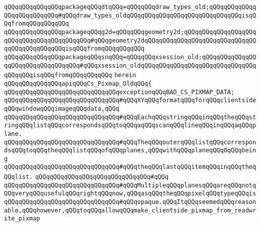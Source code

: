 \verb|qQQqqQQqqQQqqQQqpackageqQQqdtqQQq=qQQqqQQqdraw_types_old;qQQqqQQqqQQqqQQqqQQqqQQqqQQq#qQQqdraw_types_oldqQQqqQQqqQQqqQQqqQQqqQQqqQQqqQQqisqQQqfromqQQqqQQqqQQq|\newline
\verb|qQQqqQQqqQQqqQQqpackageqQQqg2d=qQQqqQQqgeometry2d;qQQqqQQqqQQqqQQqqQQqqQQqqQQqqQQqqQQqqQQqqQQq#qQQqgeometry2dqQQqqQQqqQQqqQQqqQQqqQQqqQQqqQQqqQQqqQQqqQQqqQQqisqQQqfromqQQqqQQqqQQq|\newline
\verb|qQQqqQQqqQQqqQQqpackageqQQqsnqQQq=qQQqqQQqxsession_old;qQQqqQQqqQQqqQQqqQQqqQQqqQQqqQQqqQQq#qQQqxsession_oldqQQqqQQqqQQqqQQqqQQqqQQqqQQqqQQqqQQqqQQqisqQQqfromqQQqqQQqqQQq|\newline
\verb|herein|\newline
\newline
\verb|qQQqqQQqqQQqqQQqapiqQQqCs_Pixmap_OldqQQq{|\newline
\newline
\verb|qQQqqQQqqQQqqQQqqQQqqQQqqQQqqQQqexceptionqQQqBAD_CS_PIXMAP_DATA;|\newline
\newline
\verb|qQQqqQQqqQQqqQQqqQQqqQQqqQQqqQQq#qQQqXYqQQqformatqQQqforqQQqclientsideqQQqwindowqQQqimageqQQqdata,qQQq|\newline
\verb|qQQqqQQqqQQqqQQqqQQqqQQqqQQqqQQq#qQQqEachqQQqstringqQQqinqQQqtheqQQqstringqQQqlistqQQqcorrespondsqQQqtoqQQqaqQQqscanqQQqlineqQQqinqQQqaqQQqplane.|\newline
\verb|qQQqqQQqqQQqqQQqqQQqqQQqqQQqqQQq#qQQqTheqQQqouterqQQqlistqQQqcorrespondsqQQqtoqQQqtheqQQqlistqQQqofqQQqplanes,qQQqwithqQQqplaneqQQq0qQQqbeing|\newline
\verb|qQQqqQQqqQQqqQQqqQQqqQQqqQQqqQQq#qQQqtheqQQqlastqQQqitemqQQqinqQQqtheqQQqlist.|\newline
\verb|qQQqqQQqqQQqqQQqqQQqqQQqqQQqqQQq#qQQq|\newline
\verb|qQQqqQQqqQQqqQQqqQQqqQQqqQQqqQQq#qQQqMultipleqQQqplanesqQQqareqQQqnotqQQqveryqQQqusefulqQQqrightqQQqnow,qQQqasqQQqtheqQQqpixelqQQqtypeqQQqis|\newline
\verb|qQQqqQQqqQQqqQQqqQQqqQQqqQQqqQQq#qQQqopaque.qQQqItqQQqseemedqQQqreasonable,qQQqhowever,qQQqtoqQQqallowqQQqmake_clientside_pixmap_from_readwrite_pixmap|\newline
